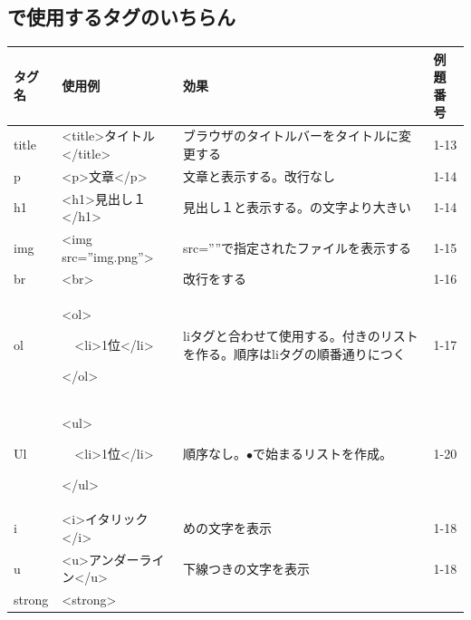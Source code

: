\documentclass[a4paper,12pt]{jarticle}
\begin{document}
\clearpage\subsection{で使用するタグのいちらん}
{\small
  \begin{center}
    \tablefirsthead{}
    \tablehead{}
    \tabletail{}
    \tablelasttail{}
    \begin{supertabular}{|m{2.171cm}|m{4.1060004cm}|m{7.8930006cm}|m{2.037cm}|}
      \hline
      タグ名 &
      使用例 &
      効果 &
      例題番号\\\hline
      title &
      {\textless}title{\textgreater}タイトル{\textless}/title{\textgreater} &
      ブラウザのタイトルバーをタイトルに変更する
      &
      1-13\\\hline
      p &
      {\textless}p{\textgreater}文章{\textless}/p{\textgreater} &
      文章と表示する。改行なし &
      1-14\\\hline
      h1 &
      {\textless}h1{\textgreater}見出し１{\textless}/h1{\textgreater} &
      見出し１と表示する。の文字より大きい
      &
      1-14\\\hline
      img &
      {\textless}img src=”img.png”{\textgreater} &
      src=””で指定されたファイルを表示する
      &
      1-15\\\hline
      br &
      {\textless}br{\textgreater} &
      改行をする &
      1-16\\\hline
      ol &
      {\textless}ol{\textgreater}

      \ \ {\textless}li{\textgreater}1位{\textless}/li{\textgreater}

      {\textless}/ol{\textgreater} &
      liタグと合わせて使用する。付きのリストを作る。順序はliタグの順番通りにつく
      &
      1-17\\\hline
      Ul &
      {\textless}ul{\textgreater}

      \ \ {\textless}li{\textgreater}1位{\textless}/li{\textgreater}

      {\textless}/ul{\textgreater} &
      順序なし。${\bullet}で始まるリストを作成。$
      &
      1-20\\\hline
      i &
      {\textless}i{\textgreater}イタリック{\textless}/i{\textgreater} &
      めの文字を表示 &
      1-18\\\hline
      u &
      {\textless}u{\textgreater}アンダーライン{\textless}/u{\textgreater} &
      下線つきの文字を表示 &
      1-18\\\hline
      strong &
      {\textless}strong{\textgreater}


\end{supertabular}
\end{center}}
\end{document}
